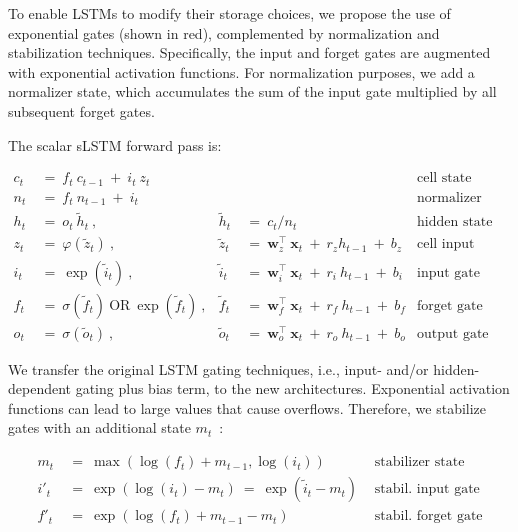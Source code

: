 To enable LSTMs to modify their storage choices, we propose the use of exponential gates (shown in red), complemented by normalization and stabilization techniques. Specifically, the input and forget gates are augmented with exponential activation functions. For normalization purposes, we add a normalizer state, which accumulates the sum of the input gate multiplied by all subsequent forget gates.

The scalar sLSTM forward pass is:

\begin{align}
\label{eq:slstmforward}
c_t \ &= \  f_t \ c_{t-1} \ + \ i_t \ z_t & & 
 &\text{cell state} \\
n_t \ &= \  f_t \ n_{t-1} \ + \ i_t  & & 
 &\text{normalizer state} \\
h_t \ &= \ o_t \ \tilde{h}_t \ ,
  &\tilde{h}_t \ &= \ c_t / n_t
&\text{hidden state} \\
z_t \ &= \ \varphi \left( \tilde{z}_t \right) \ , 
  &\tilde{z}_t \ &=  \ \mathbf{w}^\top_{z} \ \mathbf{x}_t \ + \
  r_{z}  h_{t-1} \ + \  b_{z}
  &\text{cell input} \\
i_t \ &= \ \!\exp \left( \tilde{i}_t  \right) \ , 
  &\tilde{i}_t \ &= \ \mathbf{w}^\top_{i} \ \mathbf{x}_t \ + \
  r_{i}  \ h_{t-1} \ + \  b_{i}
  &\text{input gate} \\
f_t \ &= \ \sigma \left(  \tilde{f}_t \right) \ \text{OR} \
\!\exp \left(  \tilde{f}_t \right) \ ,
  &\tilde{f}_t \ &= \ \mathbf{w}^\top_{f} \ \mathbf{x}_t  \ + \
  r_{f}  \ h_{t-1} \ + \  b_{f}
  &\text{forget gate} \\
o_t \ &= \ \sigma \left( \tilde{o}_t \right) \ , 
  &\tilde{o}_t  \ &= \ \mathbf{w}^\top_{o} \ \mathbf{x}_t \ + \
  r_{o}  \ h_{t-1} \ + \  b_{o}
  &\text{output gate} 
\end{align}

We transfer the original LSTM gating techniques, i.e., input- and/or hidden-dependent gating plus bias term, to the new architectures. Exponential activation functions can lead to large values that cause overflows. Therefore, we stabilize gates with an additional state \mbox{$m_t$~\citep{Milakov:18arxiv}}:

\begin{align}
\label{eq:slstmstabil}
m_t \ &= \ \max \left( \log ( f_t ) + m_{t-1} , \log ( i_t ) \right) &\text{stabilizer state} \\
i'_t \ &= \ \!\exp \left( \log \left ( i_t \right) - m_t \right) \ = \ \!\exp \left( \tilde{i}_t - m_t \right) \ \, 
  &\text{stabil. input gate} \\
f'_t \ &= \ \!\exp \left( \log \left( f_t \right) + m_{t-1} - m_t \right) \ \, 
  &\text{stabil. forget gate}
\end{align}

